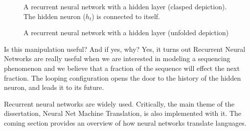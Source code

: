 \documentclass[final]{ua-thesis}
\numberwithin{equation}{section}
\begin{document}
\begin{figure}
\caption{A recurrent neural network with a hidden layer (clasped depiction). The hidden neuron ($h_{t}$) is connected to itself.}
\centering
{}
\end{figure}

\begin{figure}
\caption{A recurrent neural network with a hidden layer (unfolded depiction)}
\centering
{}
\end{figure}

Is this manipulation useful? And if yes, why? Yes, it turns out Recurrent Neural Networks are really useful when we are interested in modeling a sequencing phenomenon and we believe that a fraction of the sequence will effect the next fraction. The looping configuration opens the door to the history of the hidden neuron, and leads it to its future. 

Recurrent neural networks are widely used. Critically, the main theme of the dissertation, Neural Net Machine Translation, is also implemented with it. The coming section provides an overview of how neural networks translate languages. 
\end{document}
